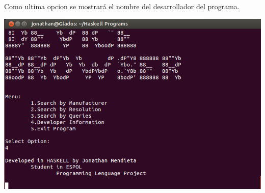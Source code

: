 \documentclass[11pt]{article} %
\begin{document}
Como ultima opcion se mostrará el nombre del desarrollador del programa.
\begin{center}
\includegraphics[scale=0.4]{screens/haskell9.png}
\end{center}
\end{document}
